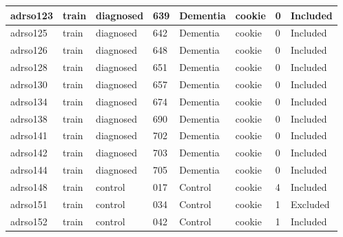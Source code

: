 \begin{center}
\begin{longtable}{|l|l|l|l|l|l|l|l|}
adrso123       & train                 & diagnosed         & 639                & Dementia             & cookie          & 0                & Included      \\ \hline
adrso125       & train                 & diagnosed         & 642                & Dementia             & cookie          & 0                & Included      \\ \hline
adrso126       & train                 & diagnosed         & 648                & Dementia             & cookie          & 0                & Included      \\ \hline
adrso128       & train                 & diagnosed         & 651                & Dementia             & cookie          & 0                & Included      \\ \hline
adrso130       & train                 & diagnosed         & 657                & Dementia             & cookie          & 0                & Included      \\ \hline
adrso134       & train                 & diagnosed         & 674                & Dementia             & cookie          & 0                & Included      \\ \hline
adrso138       & train                 & diagnosed         & 690                & Dementia             & cookie          & 0                & Included      \\ \hline
adrso141       & train                 & diagnosed         & 702                & Dementia             & cookie          & 0                & Included      \\ \hline
adrso142       & train                 & diagnosed         & 703                & Dementia             & cookie          & 0                & Included      \\ \hline
adrso144       & train                 & diagnosed         & 705                & Dementia             & cookie          & 0                & Included      \\ \hline
adrso148       & train                 & control           & 017                & Control              & cookie          & 4                & Included      \\ \hline
adrso151       & train                 & control           & 034                & Control              & cookie          & 1                & Excluded      \\ \hline
adrso152       & train                 & control           & 042                & Control              & cookie          & 1                & Included      \\ \hline

\end{longtable}
\end{center}
